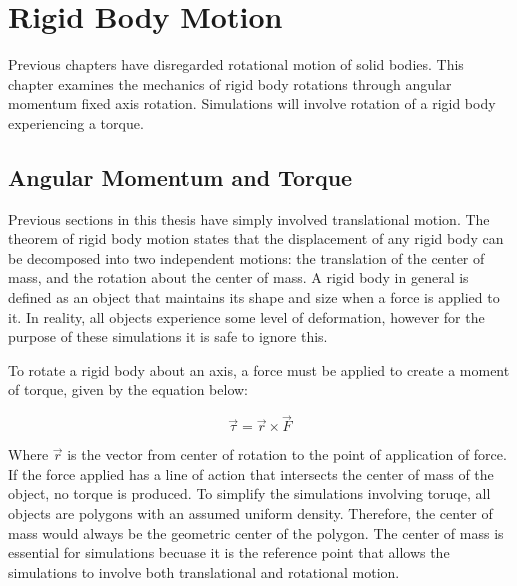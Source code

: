 
\chapter{Rigid Body Motion} %

\label{Chapter3} %



Previous chapters have disregarded rotational motion of solid bodies.  This chapter examines the mechanics of rigid body rotations through angular momentum fixed axis rotation.  Simulations will involve rotation of a rigid body experiencing a torque.


\section{Angular Momentum and Torque}

Previous sections in this thesis have simply involved translational motion.  The theorem of rigid body motion states that the displacement of any rigid body can be decomposed into two independent motions: the translation of the center of mass, and the rotation about the center of mass.  A rigid body in general is defined as an object that maintains its shape and size when a force is applied to it.  In reality, all objects experience some level of deformation, however for the purpose of these simulations it is safe to ignore this.  

To rotate a rigid body about an axis, a force must be applied to create a moment of torque, given by the equation below:

\begin{equation} \label{eq:torquegeneral}
\vec{\tau} = \vec{r} \times \vec{F}
\end{equation}


Where $\vec{r}$ is the vector from center of rotation to the point of application of force.  If the force applied has a line of action that intersects the center of mass of the object, no torque is produced.  To simplify the simulations involving toruqe, all objects are polygons with an assumed uniform density.  Therefore, the center of mass would always be the geometric center of the polygon.  The center of mass is essential for simulations becuase it is the reference point that allows the simulations to involve both translational and rotational motion. 

